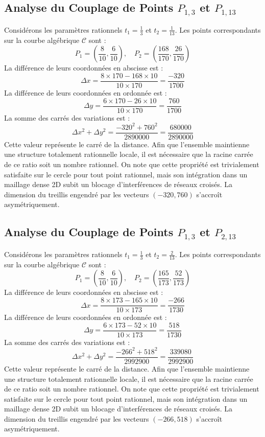 \documentclass[12pt, a4paper]{article}
\begin{document}
\subsection{Analyse du Couplage de Points $P_{1,3}$ et $P_{1,13}$}
Considérons les paramètres rationnels $t_1 = \frac{1}{3}$ et $t_2 = \frac{1}{13}$.
Les points correspondants sur la courbe algébrique $\mathcal{C}$ sont :
$$ P_1 = \left( \frac{8}{10}, \frac{6}{10} \right), \quad P_2 = \left( \frac{168}{170}, \frac{26}{170} \right) $$
La différence de leurs coordonnées en abscisse est :
$$ \Delta x = \frac{8 \times 170 - 168 \times 10}{10 \times 170} = \frac{-320}{1700} $$
La différence de leurs coordonnées en ordonnée est :
$$ \Delta y = \frac{6 \times 170 - 26 \times 10}{10 \times 170} = \frac{760}{1700} $$
La somme des carrés des variations est :
$$ \Delta x^2 + \Delta y^2 = \frac{ -320^2 + 760^2 }{ 2890000 } = \frac{ 680000 }{ 2890000 } $$
Cette valeur représente le carré de la distance. Afin que l'ensemble maintienne une structure totalement rationnelle locale, il est nécessaire que la racine carrée de ce ratio soit un nombre rationnel. On note que cette propriété est trivialement satisfaite sur le cercle pour tout point rationnel, mais son intégration dans un maillage dense 2D subit un blocage d'interférences de réseaux croisés. La dimension du treillis engendré par les vecteurs $( -320, 760 )$ s'accroît asymétriquement.


\subsection{Analyse du Couplage de Points $P_{1,3}$ et $P_{2,13}$}
Considérons les paramètres rationnels $t_1 = \frac{1}{3}$ et $t_2 = \frac{2}{13}$.
Les points correspondants sur la courbe algébrique $\mathcal{C}$ sont :
$$ P_1 = \left( \frac{8}{10}, \frac{6}{10} \right), \quad P_2 = \left( \frac{165}{173}, \frac{52}{173} \right) $$
La différence de leurs coordonnées en abscisse est :
$$ \Delta x = \frac{8 \times 173 - 165 \times 10}{10 \times 173} = \frac{-266}{1730} $$
La différence de leurs coordonnées en ordonnée est :
$$ \Delta y = \frac{6 \times 173 - 52 \times 10}{10 \times 173} = \frac{518}{1730} $$
La somme des carrés des variations est :
$$ \Delta x^2 + \Delta y^2 = \frac{ -266^2 + 518^2 }{ 2992900 } = \frac{ 339080 }{ 2992900 } $$
Cette valeur représente le carré de la distance. Afin que l'ensemble maintienne une structure totalement rationnelle locale, il est nécessaire que la racine carrée de ce ratio soit un nombre rationnel. On note que cette propriété est trivialement satisfaite sur le cercle pour tout point rationnel, mais son intégration dans un maillage dense 2D subit un blocage d'interférences de réseaux croisés. La dimension du treillis engendré par les vecteurs $( -266, 518 )$ s'accroît asymétriquement.
\end{document}
